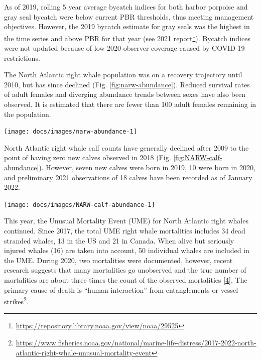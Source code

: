 \documentclass[
  10pt,
]{article}
\let\origfigure\figure
\let\endorigfigure\endfigure
\renewenvironment{figure}[1][2] {
    \expandafter\origfigure\expandafter[H]
} {
    \endorigfigure
}
\begin{document}
As of 2019, rolling 5 year average bycatch indices for both harbor
porpoise and gray seal bycatch were below current PBR thresholds, thus
meeting management objectives. However, the 2019 bycatch estimate for
gray seals was the highest in the time series and above PBR for that
year (see 2021 report\footnote{\url{https://repository.library.noaa.gov/view/noaa/29525}}).
Bycatch indices were not updated because of low 2020 observer coverage
caused by COVID-19 restrictions.

The North Atlantic right whale population was on a recovery trajectory
until 2010, but has since declined (Fig. \ref{fig:narw-abundance}).
Reduced survival rates of adult females and diverging abundance trends
between sexes have also been observed. It is estimated that there are
fewer than 100 adult females remaining in the population.

\begin{figure}

{\centering \texttt{[image: docs/images/narw-abundance-1]} 

}

\caption{Estimated North Atlanic right whale abundance on the Northeast Shelf.}\label{fig:narw-abundance}
\end{figure}

North Atlantic right whale calf counts have generally declined after
2009 to the point of having zero new calves observed in 2018 (Fig.
\ref{fig:NARW-calf-abundance}). However, seven new calves were born in
2019, 10 were born in 2020, and preliminary 2021 observations of 18
calves have been recorded as of January 2022.\\

\begin{figure}

{\centering \texttt{[image: docs/images/NARW-calf-abundance-1]} 

}

\caption{Number of North Atlantic right whale calf births, 1990 - 2021.}\label{fig:NARW-calf-abundance}
\end{figure}

This year, the Unusual Mortality Event (UME) for North Atlantic right
whales continued. Since 2017, the total UME right whale mortalities
includes 34 dead stranded whales, 13 in the US and 21 in Canada. When
alive but seriously injured whales (16) are taken into account, 50
individual whales are included in the UME. During 2020, two mortalities
were documented, however, recent research suggests that many mortalities
go unobserved and the true number of mortalities are about three times
the count of the observed mortalities
{[}\protect\hyperlink{ref-pace_cryptic_2021}{4}{]}. The primary cause of
death is ``human interaction'' from entanglements or vessel
strikes\footnote{\url{https://www.fisheries.noaa.gov/national/marine-life-distress/2017-2022-north-atlantic-right-whale-unusual-mortality-event}}.
\end{document}
